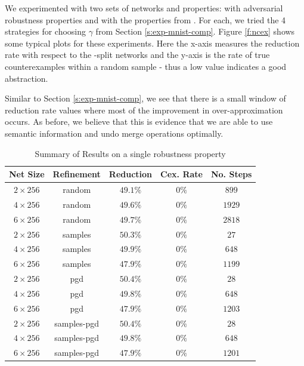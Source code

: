 We experimented with two sets of networks and properties: \mnist with
adversarial robustness properties and \acasxu with the properties from
\cite{reluplex}. For each, we tried the 4 strategies for choosing $\gamma$ from
Section \ref{s:exp-mnist-comp}.
Figure \ref{f:ncex} shows some typical plots
for these experiments. Here the x-axis measures the reduction rate with respect
to the \inc-\dec split networks and the y-axis is the rate of true
counterexamples within a random sample - thus a low value indicates a good
abstraction.

Similar to Section \ref{s:exp-mnist-comp}, we see that there is a small window
of reduction rate values where most of the improvement in over-approximation
occurs. As before, we believe that this is evidence that we are able to use
semantic information and undo merge operations optimally.

\begin{table}
\begin{tabular}{|c|c|c|c|c|}
    \hline
    Net Size     & Refinement  & Reduction & Cex. Rate & No. Steps \\
    \hline
    $2\times256$ & random      & $49.1\%$  & $  0\%$  & $ 899$    \\
    $4\times256$ & random      & $49.6\%$  & $  0\%$  & $1929$    \\
    $6\times256$ & random      & $49.7\%$  & $  0\%$  & $2818$    \\
    $2\times256$ & samples     & $50.3\%$  & $  0\%$  & $  27$    \\
    $4\times256$ & samples     & $49.9\%$  & $  0\%$  & $ 648$    \\
    $6\times256$ & samples     & $47.9\%$  & $  0\%$  & $1199$    \\
    $2\times256$ & pgd         & $50.4\%$  & $  0\%$  & $  28$    \\
    $4\times256$ & pgd         & $49.8\%$  & $  0\%$  & $ 648$    \\
    $6\times256$ & pgd         & $47.9\%$  & $  0\%$  & $1203$    \\
    $2\times256$ & samples-pgd & $50.4\%$  & $  0\%$  & $  28$    \\
    $4\times256$ & samples-pgd & $49.8\%$  & $  0\%$  & $ 648$    \\
    $6\times256$ & samples-pgd & $47.9\%$  & $  0\%$  & $1201$    \\
    \hline
\end{tabular}
\caption{Summary of \mnist Results on a single robustness property }
\label{t:mnist-prop-summary}
\end{table}

